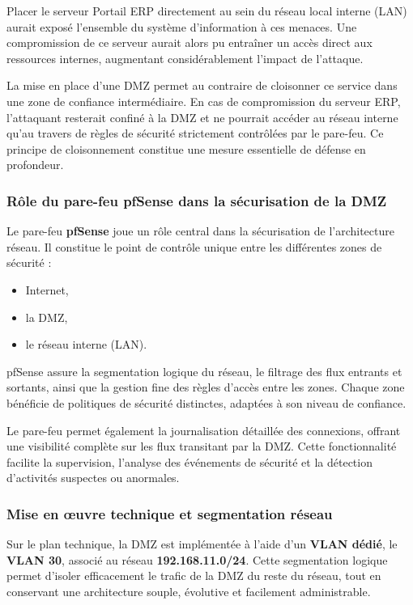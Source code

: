 \noindent Placer le serveur Portail ERP directement au sein du réseau local interne (LAN) aurait exposé l’ensemble du système d’information à ces menaces. Une compromission de ce serveur aurait alors pu entraîner un accès direct aux ressources internes, augmentant considérablement l’impact de l’attaque.

\noindent La mise en place d’une DMZ permet au contraire de cloisonner ce service dans une zone de confiance intermédiaire. En cas de compromission du serveur ERP, l’attaquant resterait confiné à la DMZ et ne pourrait accéder au réseau interne qu’au travers de règles de sécurité strictement contrôlées par le pare-feu. Ce principe de cloisonnement constitue une mesure essentielle de défense en profondeur.

\subsubsection*{Rôle du pare-feu pfSense dans la sécurisation de la DMZ}

\noindent Le pare-feu \textbf{pfSense} joue un rôle central dans la sécurisation de l’architecture réseau. Il constitue le point de contrôle unique entre les différentes zones de sécurité :
\begin{itemize}
    \item Internet,
    \item la DMZ,
    \item le réseau interne (LAN).
\end{itemize}

\noindent pfSense assure la segmentation logique du réseau, le filtrage des flux entrants et sortants, ainsi que la gestion fine des règles d’accès entre les zones. Chaque zone bénéficie de politiques de sécurité distinctes, adaptées à son niveau de confiance.

\noindent Le pare-feu permet également la journalisation détaillée des connexions, offrant une visibilité complète sur les flux transitant par la DMZ. Cette fonctionnalité facilite la supervision, l’analyse des événements de sécurité et la détection d’activités suspectes ou anormales.

\subsubsection*{Mise en œuvre technique et segmentation réseau}

\noindent Sur le plan technique, la DMZ est implémentée à l’aide d’un \textbf{VLAN dédié}, le \textbf{VLAN 30}, associé au réseau \textbf{192.168.11.0/24}.  
Cette segmentation logique permet d’isoler efficacement le trafic de la DMZ du reste du réseau, tout en conservant une architecture souple, évolutive et facilement administrable.

